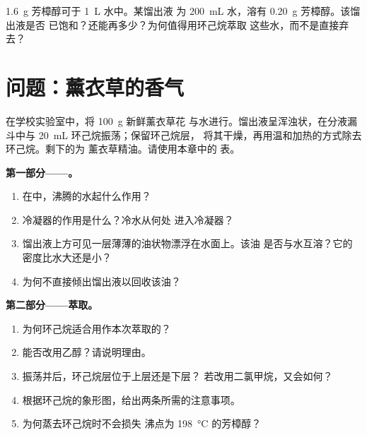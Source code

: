 \begin{exercise}[$\star\star\star$]\label{exo:g10:chemical-species:15}
\qty{1.6}{g} 芳樟醇可于 \qty{1}{L} 水中。某馏出液
为 \qty{200}{mL} 水，溶有 \qty{0.20}{g} 芳樟醇。该馏出液是否
已饱和？还能再多少？为何值得用环己烷萃取
这些水，而不是直接弃去？
\end{exercise}

\clearpage %
\section{问题：薰衣草的香气}

\begin{problem}
\label{pb:g10:chemical-species:1}
在学校实验室中，将 \qty{100}{g} 新鲜薰衣草花
与水进行。馏出液呈浑浊状，在分液漏斗中与
\qty{20}{mL} 环己烷振荡；保留环己烷层，
将其干燥，再用温和加热的方式除去环己烷。剩下的为
薰衣草精油。请使用本章中的
表。

\medskip
\noindent\textbf{第一部分——。}
\begin{enumerate}
  \item 在中，沸腾的水起什么作用？
  \item 冷凝器的作用是什么？冷水从何处
        进入冷凝器？
  \item 馏出液上方可见一层薄薄的油状物漂浮在水面上。该油
        是否与水互溶？它的密度比水大还是小？
  \item 为何不直接倾出馏出液以回收该油？
\end{enumerate}

\medskip
\noindent\textbf{第二部分——萃取。}
\begin{enumerate}[resume]
  \item 为何环己烷适合用作本次萃取的？
  \item 能否改用乙醇？请说明理由。
  \item 振荡并后，环己烷层位于上层还是下层？
        若改用二氯甲烷，又会如何？
  \item 根据环己烷的象形图，给出两条所需的注意事项。
  \item 为何蒸去环己烷时不会损失
        沸点为 \qty{198}{\celsius} 的芳樟醇？
\end{enumerate}


\end{problem}
